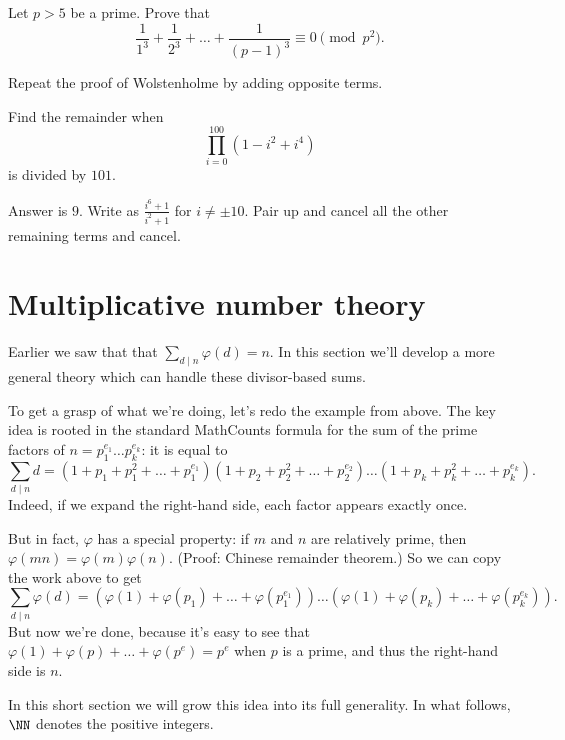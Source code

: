 \documentclass[11pt]{scrartcl}
\begin{document}
\begin{problem}
  Let $p > 5$ be a prime.
  Prove that
  \[ \frac{1}{1^3} + \frac{1}{2^3} + \dots + \frac{1}{(p-1)^3}
    \equiv 0 \pmod{p^2}. \]
  \begin{hint}
    Repeat the proof of Wolstenholme by adding opposite terms.
  \end{hint}
\end{problem}

\begin{problem}
  Find the remainder when
  \[ \prod_{i=0}^{100} (1-i^2+i^4) \]
  is divided by $101$.
  \begin{hint}
    Answer is $9$.
    Write as $\frac{i^6+1}{i^2+1}$ for $i \neq \pm 10$.
    Pair up and cancel all the other remaining terms and cancel.
  \end{hint}
\end{problem}

\section{Multiplicative number theory}
Earlier we saw that that $\sum_{d \mid n} \varphi(d) = n$.
In this section we'll develop a more general theory
which can handle these divisor-based sums.

To get a grasp of what we're doing, let's redo the example from above.
The key idea is rooted in the standard MathCounts formula for
the sum of the prime factors of $n = p_1^{e_1} \dots p_k^{e_k}$:
it is equal to
\[
  \sum_{d \mid n} d
  = \left( 1 + p_1 + p_1^2 + \dots + p_1^{e_1} \right)
  \left( 1 + p_2 + p_2^2 + \dots + p_2^{e_2} \right)
  \dots
  \left( 1 + p_k + p_k^2 + \dots + p_k^{e_k} \right).
\]
Indeed, if we expand the right-hand side, each factor appears exactly once.

But in fact, $\varphi$ has a special property:
if $m$ and $n$ are relatively prime,
then $\varphi(mn) = \varphi(m)\varphi(n)$.
(Proof: Chinese remainder theorem.)
So we can copy the work above to get
\[
  \sum_{d \mid n} \varphi(d)
  = \left( \varphi(1) + \varphi(p_1) + \dots + \varphi(p_1^{e_1}) \right)
  \dots
  \left( \varphi(1) + \varphi(p_k) + \dots + \varphi(p_k^{e_k}) \right).
\]
But now we're done,
because it's easy to see that $\varphi(1) + \varphi(p) + \dots + \varphi(p^e) = p^e$
when $p$ is a prime, and thus the right-hand side is $n$.

In this short section we will grow this idea into its full generality.
In what follows, $\NN$ denotes the positive integers.
\end{document}
